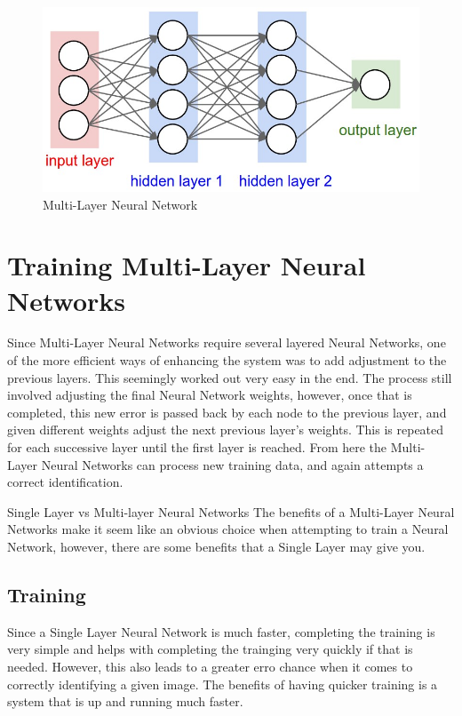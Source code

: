 \documentclass{article}
\begin{document}
\begin{figure}[h]
  \centering
  \includegraphics[width=\textwidth]{pics/multi_layer.jpg}
  \caption{Multi-Layer Neural Network}
\end{figure}

\section{Training Multi-Layer Neural Networks}
Since Multi-Layer Neural Networks require several layered Neural Networks, one of the more efficient ways of enhancing the system was to add adjustment to the previous layers. This seemingly worked out very easy in the end. The process still involved adjusting the final Neural Network weights, however, once that is completed, this new error is passed back by each node to the previous layer, and given different weights adjust the next previous layer’s weights. This is repeated for each successive layer until the first layer is reached. From here the Multi-Layer Neural Networks can process new training data, and again attempts a correct identification.

Single Layer vs Multi-layer Neural Networks
The benefits of a Multi-Layer Neural Networks make it seem like an obvious choice when attempting to train a Neural Network, however, there are some benefits that a Single Layer may give you.

\subsection{Training}

Since a Single Layer Neural Network is much faster, completing the training is very simple and helps with completing the trainging very quickly if that is needed. However, this also leads to a greater erro chance when it comes to correctly identifying a given image. The benefits of having quicker training is a system that is up and running much faster.
\end{document}
